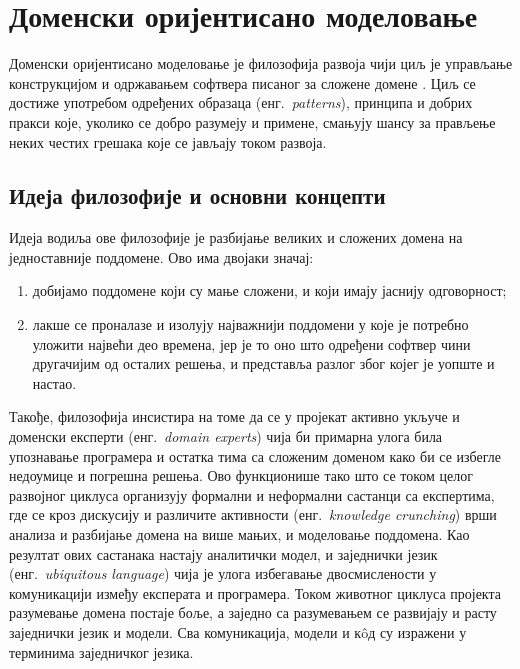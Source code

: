 \documentclass[12pt,oneside]{memoir}
\begin{document}
\chapter{Доменски оријентисано моделовање}\label{domenskiorijentisanomodelovanje}
Доменски оријентисано моделовање је филозофија развоја чији циљ је управљање конструкцијом и одржавањем софтвера писаног за сложене домене \cite{DomainDrivenDessign}. Циљ се достиже употребом одређених образаца (енг.~\textit{patterns}), принципа и добрих пракси које, уколико се добро разумеју и примене, смањују шансу за прављење неких честих грешака које се јављају током развоја.

\section{Идеја филозофије и основни концепти}
Идеја водиља ове филозофије је разбијање великих и сложених домена на једноставније поддомене. Ово има двојаки значај:
\begin{enumerate}
\item добијамо поддомене који су мање сложени, и који имају јаснију одговорност;
\item лакше се проналазе и изолују најважнији поддомени у које је потребно уложити највећи део времена, јер је то оно што одређени софтвер чини другачијим од осталих решења, и представља разлог због којег је уопште и настао.
\end{enumerate}

Такође, филозофија инсистира на томе да се у пројекат активно укључе и доменски експерти (енг.~\textit{domain experts}) чија би примарна улога била упознавање програмера и остатка тима са сложеним доменом како би се избегле недоумице и погрешна решења. Ово функционише тако што се током целог развојног циклуса организују формални и неформални састанци са експертима, где се кроз дискусију и различите активности (енг.~\textit{knowledge crunching}) врши анализа и разбијање домена на више мањих, и моделовање поддомена. Као резултат ових састанака настају аналитички модел, и заједнички језик (енг.~\textit{ubiquitous language}) чија је улога избегавање двосмислености у комуникацији између експерата и програмера. Током животног циклуса пројекта разумевање домена постаје боље, а заједно са разумевањем се развијају и расту заједнички језик и модели. Сва комуникација, модели и кôд су изражени у терминима заједничког језика.
\end{document}
